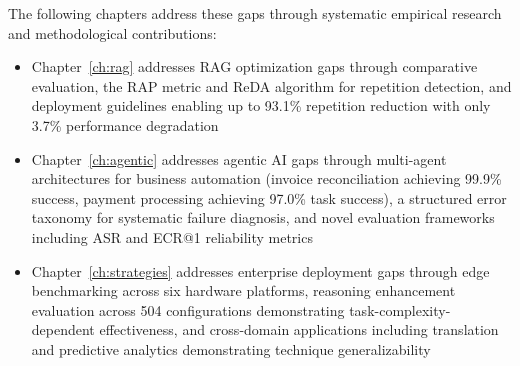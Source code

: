 The following chapters address these gaps through systematic empirical research and methodological contributions:

\begin{itemize}[leftmargin=*]
    \item Chapter~\ref{ch:rag} addresses RAG optimization gaps through comparative evaluation, the RAP metric and ReDA algorithm for repetition detection, and deployment guidelines enabling up to 93.1\% repetition reduction with only 3.7\% performance degradation
    \item Chapter~\ref{ch:agentic} addresses agentic AI gaps through multi-agent architectures for business automation (invoice reconciliation achieving 99.9\% success, payment processing achieving 97.0\% task success), a structured error taxonomy for systematic failure diagnosis, and novel evaluation frameworks including ASR and ECR@1 reliability metrics
    \item Chapter~\ref{ch:strategies} addresses enterprise deployment gaps through edge benchmarking across six hardware platforms, reasoning enhancement evaluation across 504 configurations demonstrating task-complexity-dependent effectiveness, and cross-domain applications including translation and predictive analytics demonstrating technique generalizability
\end{itemize}